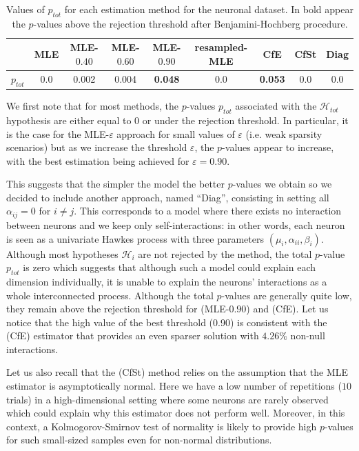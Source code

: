     \begin{table}[!ht] 
    \begin{center}
    \setlength{\tabcolsep}{2pt}
    \centering
    \begin{tabular}{c|c|ccc|ccc|c}
          & MLE & MLE-$0.40$ & MLE-$0.60$ & MLE-$0.90$ & resampled-MLE & CfE & CfSt & Diag\\
         \toprule
         $p_{tot}$ & 0.0 & 0.002 & 0.004 & \textbf{0.048} & 0.0 & \textbf{0.053} & 0.0 & 0.0
    \end{tabular}
    \caption{Values of $p_{tot}$ for each estimation method for the neuronal dataset. In bold appear the \(p\)-values above the rejection threshold after Benjamini-Hochberg procedure.}
    \label{tab:chap3_p_tot_neurons}
    \end{center}
    \end{table}
    
 We first note that for most methods, the $p$-values $p_{tot}$ associated with the  $\mathcal{H}_{tot}$ hypothesis are either equal to 0 or under the rejection threshold. In particular, it is the case for the MLE-$\varepsilon$ approach for small values of $\varepsilon$ (i.e. weak sparsity scenarios) but as we increase the threshold $\varepsilon$, the $p$-values appear to increase, with the best estimation being achieved for $\varepsilon = 0.90$.
 
 This suggests that the simpler the model the better $p$-values we obtain so we decided to include another approach, named ``Diag'', consisting in setting all $\alpha_{ij} = 0$ for $i \neq j$. This corresponds to a model where there exists no interaction between neurons and we keep only self-interactions: in other words, each neuron is seen as a univariate Hawkes process with three parameters $(\mu_i,\alpha_{ii}, \beta_i)$. Although most hypotheses $\mathcal{H}_i$ are not rejected by the method, the total $p$-value $p_{tot}$ is zero which suggests that although such a model could explain each dimension individually, it is unable to explain the neurons' interactions as a whole interconnected process.
Although the total $p$-values are generally quite low, they remain above the rejection threshold for (MLE-$0.90$) and (CfE).
Let us notice that the high value of the best threshold (0.90) is consistent with the (CfE) estimator that provides an even sparser solution with $4.26\%$ non-null interactions. 

Let us also recall that the (CfSt) method relies on the assumption that the MLE estimator is asymptotically normal. Here we have a low number of repetitions ($10$ trials) in a high-dimensional setting where some neurons are rarely observed which could explain why this estimator does not perform well. Moreover, in this context, a Kolmogorov-Smirnov test of normality is likely to provide high $p$-values for such small-sized samples even for non-normal distributions.
 
